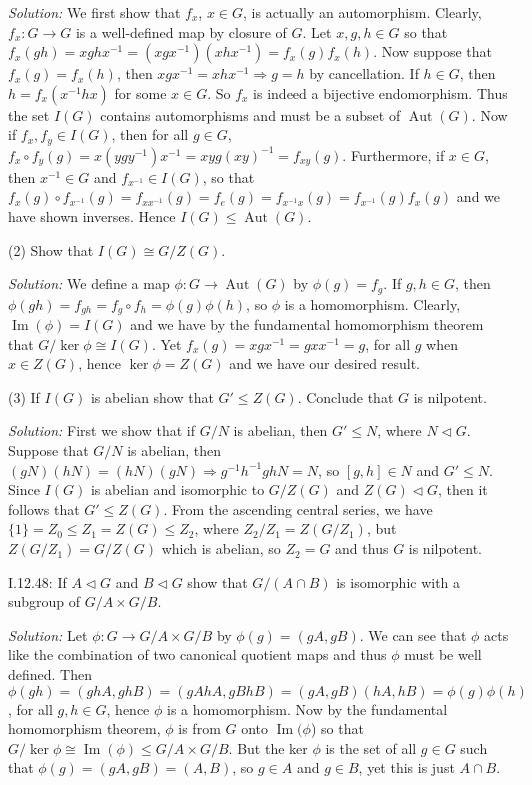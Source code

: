 \documentclass{letter}
\newcommand{\tmem}[1]{{\em #1\/}}
\newcommand{\tmop}[1]{\ensuremath{\operatorname{#1}}}
\begin{document}
{\tmem{Solution:}} We first show that $f_x$, $x \in G$, is actually an
automorphism. Clearly, $f_x : G \rightarrow G$ is a well-defined map by
closure of $G$. Let $x, g, h \in G$ so that $f_x (g h) = x g h x^{- 1} = (x g
x^{- 1}) (x h x^{- 1}) = f_x (g) f_x (h)$. Now suppose that $f_x (g) = f_x
(h)$, then $x g x^{- 1} = x h x^{- 1} \Rightarrow g = h$ by cancellation. If
$h \in G$, then $h = f_x (x^{- 1} h x)$ for some $x \in G$. So $f_x$ is indeed
a bijective endomorphism. Thus the set $I (G)$ contains automorphisms and must
be a subset of $\tmop{Aut} (G)$. Now if $f_x, f_y \in I (G)$, then for all $g
\in G$, $f_x \circ f_y (g) = x (y g y^{- 1}) x^{- 1} = x y g (x y)^{- 1} =
f_{x y} (g)$. Furthermore, if $x \in G$, then $x^{- 1} \in G$ and $f_{x^{- 1}}
\in I (G)$, so that $f_x (g) \circ f_{x^{- 1}} (g) = f_{x x^{- 1}} (g) = f_e
(g) = f_{x^{- 1} x} (g) = f_{x^{- 1}} (g) f_x (g)$ and we have shown inverses.
Hence $I (G) \leq \tmop{Aut} (G)$.

(2) Show that $I (G) \cong G / Z (G)$.

{\tmem{Solution:}} We define a map $\phi : G \rightarrow \tmop{Aut} (G)$ by
$\phi (g) = f_g$. If $g, h \in G$, then $\phi (g h) = f_{g h} = f_g \circ f_h
= \phi (g) \phi (h)$, so $\phi$ is a homomorphism. Clearly, $\tmop{Im} (\phi)
= I (G)$ and we have by the fundamental homomorphism theorem that $G / \ker
\phi \cong I (G)$. Yet $f_x (g) = x g x^{- 1} = g x x^{- 1} = g$, for all $g$
when $x \in Z (G)$, hence $\ker \phi = Z (G)$ and we have our desired result.
\

(3) If $I (G)$ is abelian show that $G' \leq Z (G)$. Conclude that $G$ is
nilpotent.

{\tmem{Solution:}} First we show that if $G / N$ is abelian, then $G' \leq N$,
where $N \vartriangleleft G$. Suppose that $G / N$ is abelian, then $(g N) (h
N) = (h N) (g N) \Rightarrow g^{- 1} h^{- 1} g h N = N$, so $[g, h] \in N$ and
$G' \leq N$. Since $I (G)$ is abelian and isomorphic to $G / Z (G)$ and $Z (G)
\vartriangleleft G$, then it follows that $G' \leq Z (G)$. From the ascending
central series, we have $\{1\}= Z_0 \leq Z_1 = Z (G) \leq Z_2$, where $Z_2 /
Z_1 = Z (G / Z_1)$, but $Z (G / Z_1) = G / Z (G)$ which is abelian, so $Z_2 =
G$ and thus $G$ is nilpotent.

I.12.48: If $A \vartriangleleft G$ and $B \vartriangleleft G$ show that $G /
(A \cap B)$ is isomorphic with a subgroup of $G / A \times G / B$.

{\tmem{Solution:}} Let $\phi : G \rightarrow G / A \times G / B$ by $\phi (g)
= (g A, g B)$. We can see that $\phi$ acts like the combination of two
canonical quotient maps and thus $\phi$ must be well defined. Then $\phi (g h)
= (g h A, g h B) = (g A h A, g B h B) = (g A, g B) (h A, h B) = \phi (g) \phi
(h)$, for all $g, h \in G$, hence $\phi$ is a homomorphism. Now by the
fundamental homomorphism theorem, $\phi$ is from $G$ onto $\tmop{Im} (\phi$)
so that $G / \ker \phi \cong \tmop{Im} (\phi) \leq G / A \times G / B$. But
the ker $\phi$ is the set of all $g \in G$ such that $\phi (g) = (g A, g B) =
(A, B)$, so $g \in A$ and $g \in B$, yet this is just $A \cap B$.
\end{document}

